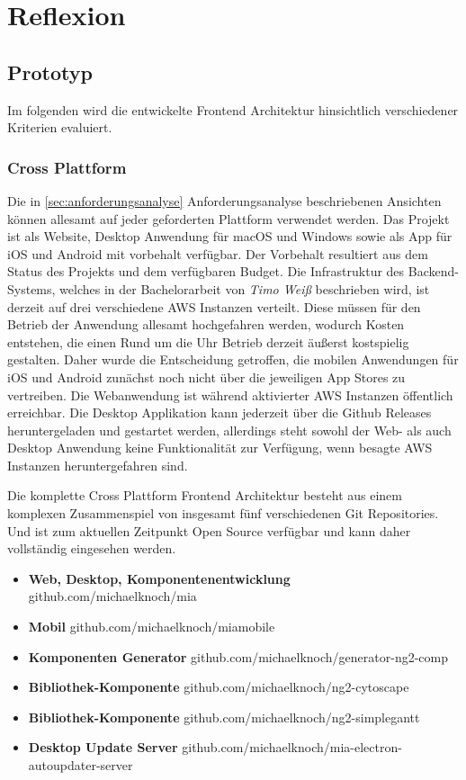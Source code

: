 
\chapter{Reflexion}
\label{chap:reflexion}

\section{Prototyp}

Im folgenden wird die entwickelte Frontend Architektur hinsichtlich verschiedener Kriterien evaluiert.

\subsection{Cross Plattform}

Die in \ref{sec:anforderungsanalyse} Anforderungsanalyse beschriebenen Ansichten können allesamt auf jeder geforderten Plattform verwendet werden.
Das Projekt \projectname{} ist als Website, Desktop Anwendung für macOS und Windows sowie als App für iOS und Android mit vorbehalt verfügbar.
Der Vorbehalt resultiert aus dem Status des Projekts und dem verfügbaren Budget.
Die Infrastruktur des Backend-Systems, welches in der Bachelorarbeit von \emph{Timo Weiß} beschrieben wird,
ist derzeit auf drei verschiedene \ac{AWS} Instanzen verteilt. Diese müssen für den Betrieb der Anwendung allesamt
hochgefahren werden, wodurch Kosten entstehen, die einen Rund um die Uhr Betrieb derzeit äußerst kostspielig gestalten.
Daher wurde die Entscheidung getroffen, die mobilen Anwendungen für iOS und Android zunächst noch nicht über die jeweiligen App Stores zu vertreiben.
Die Webanwendung ist während aktivierter \ac{AWS} Instanzen öffentlich erreichbar.
Die Desktop Applikation kann jederzeit über die Github Releases heruntergeladen und gestartet werden,
allerdings steht sowohl der Web- als auch Desktop Anwendung keine Funktionalität zur Verfügung, wenn besagte \ac{AWS}
Instanzen heruntergefahren sind.


Die komplette Cross Plattform Frontend Architektur besteht aus einem komplexen Zusammenspiel von insgesamt fünf verschiedenen Git Repositories.
Und ist zum aktuellen Zeitpunkt Open Source verfügbar und kann daher vollständig eingesehen werden.

\begin{itemize}
  \item{\textbf{Web, Desktop, Komponentenentwicklung} github.com/michaelknoch/mia}
  \item{\textbf{Mobil} github.com/michaelknoch/miamobile}
  \item{\textbf{Komponenten Generator} github.com/michaelknoch/generator-ng2-comp}
  \item{\textbf{Bibliothek-Komponente} github.com/michaelknoch/ng2-cytoscape}
  \item{\textbf{Bibliothek-Komponente} github.com/michaelknoch/ng2-simplegantt}
  \item{\textbf{Desktop Update Server} github.com/michaelknoch/mia-electron-autoupdater-server}
\end{itemize}


